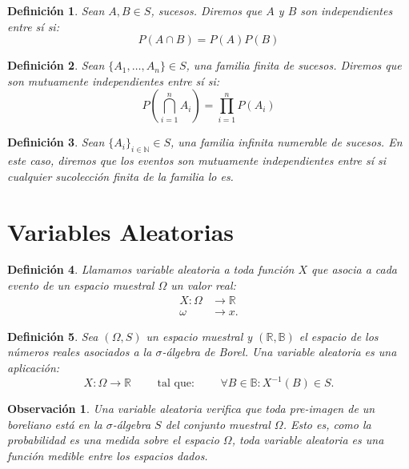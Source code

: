 \documentclass{report}
\newtheorem{dfn}{Definición}[section]
\newtheorem{obs}{Observación}[section]
\begin{document}
\begin{dfn}
Sean $A, B\in S$, sucesos. Diremos que $A$ y $B$ son \emph{independientes} entre sí si:
$$
P(A\cap B) = P(A)P(B)
$$
\end{dfn}

\begin{dfn}
Sean $\{A_1, \ldots, A_n\}\in S$, una familia finita de sucesos. Diremos que son \emph{mutuamente independientes} entre sí si:
$$
P\left(\bigcap_{i=1}^n A_i \right) = \prod_{i=1}^{n} P(A_i)
$$
\end{dfn}

\begin{dfn}
Sean $\{A_i\}_{i\in\mathbb{N}}\in S$, una familia infinita numerable de sucesos. En este caso, diremos que los eventos son mutuamente
independientes entre sí si cualquier sucolección finita de la familia lo es.
\end{dfn}

\section{Variables Aleatorias}

\begin{dfn}
Llamamos \emph{variable aleatoria} a toda función $X$ que asocia a cada evento de un espacio muestral $\Omega$ un valor real:
\begin{equation*}
\begin{split}
    X: \Omega & \rightarrow \mathbb{R} \\
    \omega & \rightarrow x.
\end{split}
\end{equation*}
\end{dfn}

\begin{dfn}
    Sea $(\Omega, S)$ un espacio muestral y $(\mathbb{R}, \mathbb{B})$ el espacio de los números reales asociados a la $\sigma$-álgebra de Borel. Una 
    variable aleatoria es una aplicación:
    \begin{equation*}
        X: \Omega \rightarrow \mathbb{R} \qquad \text{ tal que: }  \qquad \forall B \in \mathbb{B}: X^{-1}(B) \in S.
    \end{equation*}

\end{dfn}

\begin{obs}
Una variable aleatoria verifica que toda pre-imagen de un boreliano está en la $\sigma$-álgebra $S$ del conjunto muestral $\Omega$. Esto es,
como la probabilidad es una medida sobre el espacio $\Omega$, toda variable aleatoria es una función medible entre los espacios dados.
\end{obs}
\end{document}
